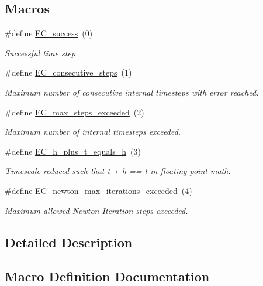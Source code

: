 \subsection*{Macros}
\begin{DoxyCompactItemize}
\item 
\#define \hyperlink{group__RK__ErrCodes_gabd83bc0f9f475a2189a4db4a08b790ca}{E\+C\+\_\+success}~(0)
\begin{DoxyCompactList}\small\item\em Successful time step. \end{DoxyCompactList}\item 
\#define \hyperlink{group__RK__ErrCodes_gae0287841c08f86f5709660fd731615ad}{E\+C\+\_\+consecutive\+\_\+steps}~(1)
\begin{DoxyCompactList}\small\item\em Maximum number of consecutive internal timesteps with error reached. \end{DoxyCompactList}\item 
\#define \hyperlink{group__RK__ErrCodes_ga0f0275d9851ab5c19b79a963d5084df3}{E\+C\+\_\+max\+\_\+steps\+\_\+exceeded}~(2)
\begin{DoxyCompactList}\small\item\em Maximum number of internal timesteps exceeded. \end{DoxyCompactList}\item 
\#define \hyperlink{group__RK__ErrCodes_ga9326efd544880e2683c4453365ca2704}{E\+C\+\_\+h\+\_\+plus\+\_\+t\+\_\+equals\+\_\+h}~(3)
\begin{DoxyCompactList}\small\item\em Timescale reduced such that t + h == t in floating point math. \end{DoxyCompactList}\item 
\#define \hyperlink{group__RK__ErrCodes_gaae2906abd9ae8a2791c2e8626ca73a32}{E\+C\+\_\+newton\+\_\+max\+\_\+iterations\+\_\+exceeded}~(4)
\begin{DoxyCompactList}\small\item\em Maximum allowed Newton Iteration steps exceeded. \end{DoxyCompactList}\end{DoxyCompactItemize}


\subsection{Detailed Description}


\subsection{Macro Definition Documentation}
